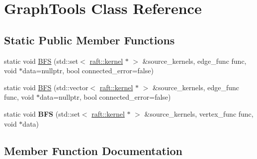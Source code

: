 \hypertarget{class_graph_tools}{}\section{Graph\+Tools Class Reference}
\label{class_graph_tools}
\subsection*{Static Public Member Functions}
\begin{DoxyCompactItemize}
\item 
static void \hyperlink{class_graph_tools_ade51007699cbd681c1a37946609c46ee}{B\+F\+S} (std\+::set$<$ \hyperlink{classraft_1_1kernel}{raft\+::kernel} $\ast$ $>$ \&source\+\_\+kernels, edge\+\_\+func func, void $\ast$data=nullptr, bool connected\+\_\+error=false)
\item 
static void \hyperlink{class_graph_tools_afc9c2852a351fe8b1a881b5d8b6c97f5}{B\+F\+S} (std\+::vector$<$ \hyperlink{classraft_1_1kernel}{raft\+::kernel} $\ast$ $>$ \&source\+\_\+kernels, edge\+\_\+func func, void $\ast$data=nullptr, bool connected\+\_\+error=false)
\item 
\hypertarget{class_graph_tools_a4223eca1b9bdb5b2b551f79b1faa155f}{}static void {\bfseries B\+F\+S} (std\+::set$<$ \hyperlink{classraft_1_1kernel}{raft\+::kernel} $\ast$ $>$ \&source\+\_\+kernels, vertex\+\_\+func func, void $\ast$data)\label{class_graph_tools_a4223eca1b9bdb5b2b551f79b1faa155f}

\end{DoxyCompactItemize}


\subsection{Member Function Documentation}
\hypertarget{class_graph_tools_ade51007699cbd681c1a37946609c46ee}{}
